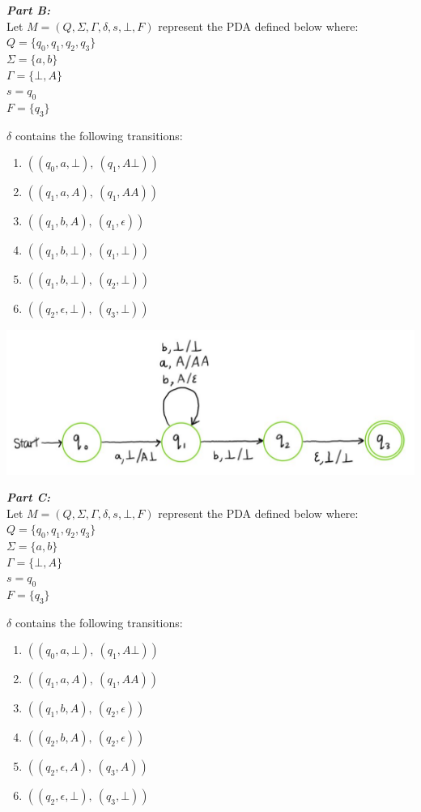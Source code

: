 \documentclass[11pt,fleqn]{article}
\newcommand{\be}{\begin{enumerate}}
\newcommand{\ee}{\end{enumerate}}
\newcommand{\set}[1]{{\{ #1 \}}}
\begin{document}
	\noindent\textbf{\emph{Part B:}}\\
	Let $M = (Q, \Sigma, \Gamma, \delta, s, \bot, F)$ represent the PDA defined below where:\\
	$Q = \set{q_0, q_1, q_2, q_3}$\\
	$\Sigma = \set{a, b}$\\
	$\Gamma = \set{\bot, A}$\\
	$s = q_0$\\
	$F = \set{q_3}$

	\noindent$\delta$ contains the following transitions:
	\be
	\item $((q_0, a, \bot),\ (q_1, A\bot))$
	\item $((q_1, a, A),\ (q_1, AA))$
	\item $((q_1, b, A),\ (q_1, \epsilon))$
	\item $((q_1, b, \bot),\ (q_1, \bot))$
	\item $((q_1, b, \bot),\ (q_2, \bot))$
	\item $((q_2, \epsilon, \bot),\ (q_3, \bot))$
	\ee

	\begin{center}
	\includegraphics[scale = 0.5]{A8partB.JPG}
	\end{center}

	\noindent\textbf{\emph{Part C:}}\\
	Let $M = (Q, \Sigma, \Gamma, \delta, s, \bot, F)$ represent the PDA defined below where:\\
	$Q = \set{q_0, q_1, q_2, q_3}$\\
	$\Sigma = \set{a, b}$\\
	$\Gamma = \set{\bot, A}$\\
	$s = q_0$\\
	$F = \set{q_3}$

	\noindent$\delta$ contains the following transitions:
	\be
	\item $((q_0, a, \bot),\ (q_1, A\bot))$
	\item $((q_1, a, A),\ (q_1, AA))$
	\item $((q_1, b, A),\ (q_2, \epsilon))$
	\item $((q_2, b, A),\ (q_2, \epsilon))$
	\item $((q_2, \epsilon, A),\ (q_3, A))$
	\item $((q_2, \epsilon, \bot),\ (q_3, \bot))$
	\ee
\end{document}
